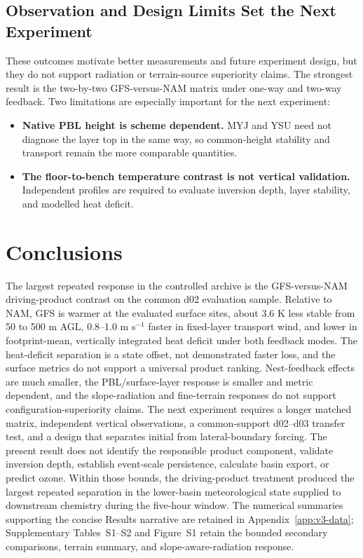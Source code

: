 \documentclass[air,article,submit,moreauthors]{Definitions/mdpi}
\begin{document}
\subsection{Observation and Design Limits Set the Next Experiment}
\label{sec:v3-disc-domains}

These outcomes motivate better measurements and future experiment design, but they do not support radiation or terrain-source superiority claims.
The strongest result is the two-by-two GFS-versus-NAM matrix under one-way and two-way feedback.
Two limitations are especially important for the next experiment:
\begin{itemize}
  \item \textbf{Native PBL height is scheme dependent.} MYJ and YSU need not diagnose the layer top in the same way, so common-height stability and transport remain the more comparable quantities.
  \item \textbf{The floor-to-bench temperature contrast is not vertical validation.} Independent profiles are required to evaluate inversion depth, layer stability, and modelled heat deficit.
\end{itemize}

\section{Conclusions}
\label{sec:v3-conclusions}

The largest repeated response in the controlled archive is the GFS-versus-NAM driving-product contrast on the common d02 evaluation sample.
Relative to NAM, GFS is warmer at the evaluated surface sites, about 3.6 K less stable from 50 to 500 m AGL, 0.8--1.0 m s$^{-1}$ faster in fixed-layer transport wind, and lower in footprint-mean, vertically integrated heat deficit under both feedback modes.
The heat-deficit separation is a state offset, not demonstrated faster loss, and the surface metrics do not support a universal product ranking.
Nest-feedback effects are much smaller, the PBL/surface-layer response is smaller and metric dependent, and the slope-radiation and fine-terrain responses do not support configuration-superiority claims.
The next experiment requires a longer matched matrix, independent vertical observations, a common-support d02--d03 transfer test, and a design that separates initial from lateral-boundary forcing.
The present result does not identify the responsible product component, validate inversion depth, establish event-scale persistence, calculate basin export, or predict ozone.
Within those bounds, the driving-product treatment produced the largest repeated separation in the lower-basin meteorological state supplied to downstream chemistry during the five-hour window.
The numerical summaries supporting the concise Results narrative are retained in Appendix~\ref{app:v3-data}; Supplementary Tables~S1--S2 and Figure~S1 retain the bounded secondary comparisons, terrain summary, and slope-aware-radiation response.
\end{document}
